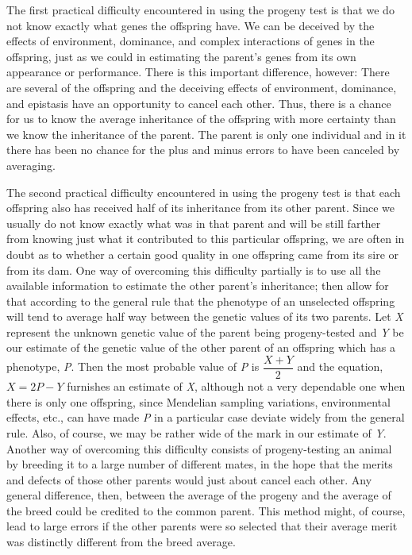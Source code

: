 The first practical difficulty encountered in using the progeny test is
that we do not know exactly what genes the offspring have. We can be
deceived by the effects of environment, dominance, and complex interactions
of genes in the offspring, just as we could in estimating the parent's
genes from its own appearance or performance. There is this important
difference, however: There are several of the offspring and the
deceiving effects of environment, dominance, and epistasis have an
opportunity to cancel each other. Thus, there is a chance for us to know
the average inheritance of the offspring with more certainty than we
know the inheritance of the parent. The parent is only one individual
and in it there has been no chance for the plus and minus errors to have
been canceled by averaging.

The second practical difficulty encountered in using the progeny
test is that each offspring also has received half of its inheritance from
its other parent. Since we usually do not know exactly what was in that
parent and will be still farther from knowing just what it contributed
to this particular offspring, we are often in doubt as to whether a certain
good quality in one offspring came from its sire or from its dam.
One way of overcoming this difficulty partially is to use all the available
information to estimate the other parent's inheritance; then allow for
that according to the general rule that the phenotype of an unselected
offspring will tend to average half way between the genetic values of its
two parents. Let \textit{X} represent the unknown genetic value of the parent
being progeny-tested and \textit{Y} be our estimate of the genetic value of the
other parent of an offspring which has a phenotype, \textit{P}. Then the most
probable value of \textit{P} is \(\dfrac{X + Y}{2}\) and the equation,
\(X = 2P - Y\) furnishes an estimate of \textit{X}, although not a very dependable one when
there is only one offspring, since Mendelian sampling variations, environmental
effects, etc., can have made \textit{P} in a particular case deviate
widely from the general rule. Also, of course, we may be rather wide of
the mark in our estimate of \textit{Y}. Another way of overcoming this difficulty
consists of progeny-testing an animal by breeding it to a large number
of different mates, in the hope that the merits and defects of those other
parents would just about cancel each other. Any general difference,
then, between the average of the progeny and the average of the breed
could be credited to the common parent. This method might, of course,
lead to large errors if the other parents were so selected that their average
merit was distinctly different from the breed average.


